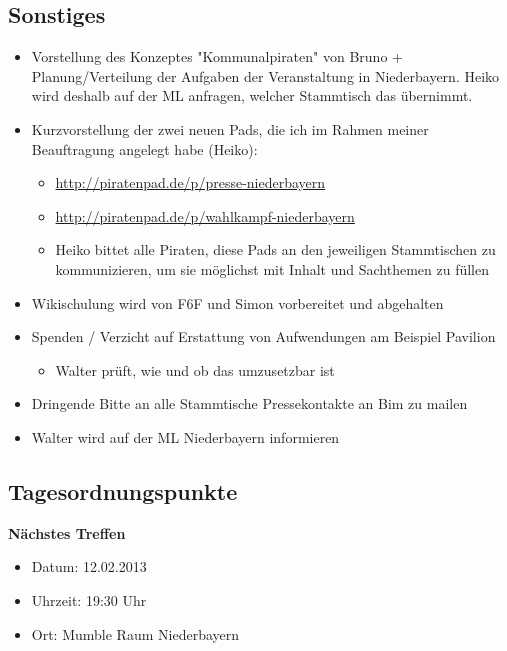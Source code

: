 \documentclass{protokoll}
\begin{document}
\subsection{Sonstiges}
\begin{itemize}
\item Vorstellung des Konzeptes "Kommunalpiraten" von Bruno +
Planung/Verteilung der Aufgaben der Veranstaltung in
Niederbayern. Heiko wird deshalb auf der ML anfragen, welcher
Stammtisch das übernimmt.
\item Kurzvorstellung der zwei neuen Pads, die ich im Rahmen meiner
Beauftragung angelegt habe (Heiko):
  \begin{itemize}
  \item \url{http://piratenpad.de/p/presse-niederbayern}
  \item \url{http://piratenpad.de/p/wahlkampf-niederbayern}
  \item Heiko bittet alle Piraten, diese Pads an den jeweiligen
  Stammtischen zu kommunizieren, um sie möglichst mit Inhalt und
  Sachthemen zu füllen
  \end{itemize}

\item Wikischulung wird von F6F und Simon vorbereitet und abgehalten

\item Spenden / Verzicht auf Erstattung von Aufwendungen am Beispiel Pavilion
  \begin{itemize}
  \item Walter prüft, wie und ob das umzusetzbar ist
  \end{itemize}

\item Dringende Bitte an alle Stammtische Pressekontakte an Bim zu mailen

\item Walter wird auf der ML Niederbayern informieren
\end{itemize}

\subsection{Tagesordnungspunkte}

\textbf{Nächstes Treffen}
  \begin{itemize}
  \item Datum: 12.02.2013
  \item Uhrzeit: 19:30 Uhr 
  \item Ort: Mumble Raum Niederbayern
  \end{itemize}
\end{document}
